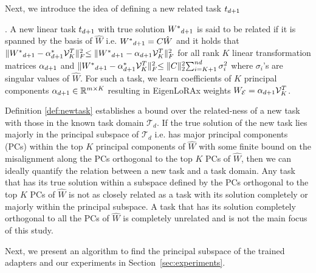 Next, we introduce the idea of defining a new related task $t_{d+1}$
\begin{definition}.
\label{def:newtask}
    A new linear task $t_{d+1}$ with true solution ${W^*}_{d+1}$ is said to be related if it is spanned by the basis of $\hat{W}$ i.e. ${W^*}_{d+1} = C\hat{W}$ and it holds that $\lVert {W^*}_{d+1} - \alpha^{*}_{d+1}\mathcal{V}^T_{K}\lVert^2_F \leq \Vert{W^*}_{d+1} - \alpha_{d+1}\mathcal{V}^T_{K}\lVert^2_F$ for all rank $K$ linear transformation matrices $\alpha_{d+1}$ and $\lVert {W^*}_{d+1} - \alpha^{*}_{d+1}\mathcal{V}^T_{K}\lVert^2_F \leq \lVert C\lVert^2_2\sum_{i=K+1}^{nd}\sigma^2_i$ where $\sigma_i$'s are singular values of $\hat{W}$. For such a task, we learn coefficients of $K$ principal components $\alpha_{d+1} \in \mathbb{R}^{m\times K}$ resulting in EigenLoRAx weights $W_{\mathcal{E}} = \alpha_{d+1}\mathcal{V}^T_{K}$. \\
\end{definition}

Definition \ref{def:newtask} establishes a bound over the related-ness of a new task with those in the known task domain $\mathcal{T}_d$. If the true solution of the new task lies majorly in the principal subspace of $\mathcal{T}_d$ i.e. has major principal components (PCs) within the top $K$ principal components of $\hat{W}$ with some finite bound on the misalignment along the PCs orthogonal to the top $K$ PCs of $\hat{W}$, then we can ideally quantify the relation between a new task and a task domain. Any task that has its true solution within a subspace defined by the PCs orthogonal to the top $K$ PCs of $\hat{W}$ is not as closely related as a task with its solution completely or majorly within the principal subspace. A task that has its solution completely orthogonal to all the PCs of $\hat{W}$ is completely unrelated and is not the main focus of this study. 

Next, we present an algorithm to find the principal subspace of the trained adapters and our experiments in Section~\ref{sec:experiments}.


